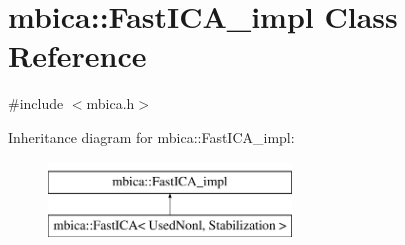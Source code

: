 \hypertarget{classmbica_1_1_fast_i_c_a__impl}{
\section{mbica::FastICA\_\-impl Class Reference}
\label{classmbica_1_1_fast_i_c_a__impl}
}


{\ttfamily \#include $<$mbica.h$>$}

Inheritance diagram for mbica::FastICA\_\-impl:\begin{figure}[H]
\begin{center}
\leavevmode
\includegraphics[height=2.000000cm]{classmbica_1_1_fast_i_c_a__impl}
\end{center}
\end{figure}
